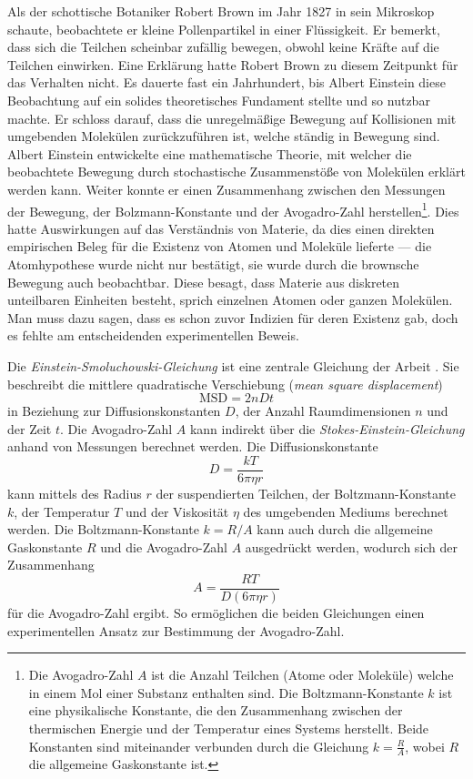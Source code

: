 Als der schottische Botaniker Robert Brown im Jahr 1827 in sein Mikroskop schaute, beobachtete er kleine Pollenpartikel in einer Flüssigkeit. Er bemerkt, dass sich die Teilchen scheinbar zufällig bewegen, obwohl keine Kräfte auf die Teilchen einwirken. Eine Erklärung hatte Robert Brown zu diesem Zeitpunkt für das Verhalten nicht. Es dauerte fast ein Jahrhundert, bis Albert Einstein diese Beobachtung auf ein solides theoretisches Fundament stellte und so nutzbar machte. Er schloss darauf, dass die unregelmäßige Bewegung auf Kollisionen mit umgebenden Molekülen zurückzuführen ist, welche ständig in Bewegung sind. Albert Einstein entwickelte eine mathematische Theorie, mit welcher die beobachtete Bewegung durch stochastische Zusammenstöße von Molekülen erklärt werden kann. Weiter konnte er einen Zusammenhang zwischen den Messungen der Bewegung, der Bolzmann-Konstante und der  Avogadro-Zahl herstellen\footnote{Die Avogadro-Zahl $ A $ ist die Anzahl Teilchen (Atome oder Moleküle) welche in einem Mol einer Substanz enthalten sind. Die Boltzmann-Konstante $ k $ ist eine physikalische Konstante, die den Zusammenhang zwischen der thermischen Energie und der Temperatur eines Systems herstellt. Beide Konstanten sind miteinander verbunden durch die Gleichung $ k = \frac{R}{A} $, wobei $ R $ die allgemeine Gaskonstante ist.}. Dies hatte Auswirkungen auf das Verständnis von Materie, da dies einen direkten empirischen Beleg für die Existenz von Atomen und Moleküle lieferte --- die Atomhypothese wurde nicht nur bestätigt, sie wurde durch die brownsche Bewegung auch beobachtbar. Diese besagt, dass Materie aus diskreten unteilbaren Einheiten besteht, sprich einzelnen Atomen oder ganzen Molekülen. Man muss dazu sagen, dass es schon zuvor Indizien für deren Existenz gab, doch es fehlte am entscheidenden experimentellen Beweis.


Die \textit{Einstein-Smoluchowski-Gleichung} ist eine zentrale Gleichung der Arbeit \cite{einstein1922untersuchungen}. Sie beschreibt die mittlere quadratische Verschiebung (\textit{mean square displacement})
\begin{equation}
	\mathrm{MSD} = 2nDt
\end{equation}
in Beziehung zur Diffusionskonstanten $ D $, der Anzahl Raumdimensionen $ n $ und der Zeit $ t $. Die Avogadro-Zahl $ A $ kann indirekt über die \textit{Stokes-Einstein-Gleichung} anhand von Messungen berechnet werden. Die Diffusionskonstante
\begin{equation}
	D = \frac{kT}{6\pi\eta r}
\end{equation}
kann mittels des Radius $ r $ der suspendierten Teilchen, der Boltzmann-Konstante  $ k $, der Temperatur $ T $ und der Viskosität $ \eta $ des umgebenden Mediums berechnet werden. Die Boltzmann-Konstante  $ k = R/A $ kann auch durch die allgemeine Gaskonstante $ R $ und die Avogadro-Zahl $ A $ ausgedrückt werden, wodurch sich der Zusammenhang
\begin{equation}
	A = \frac{R T}{D (6 \pi \eta r)}
\end{equation}
für die Avogadro-Zahl ergibt. So ermöglichen die beiden Gleichungen einen experimentellen Ansatz zur Bestimmung der Avogadro-Zahl.

